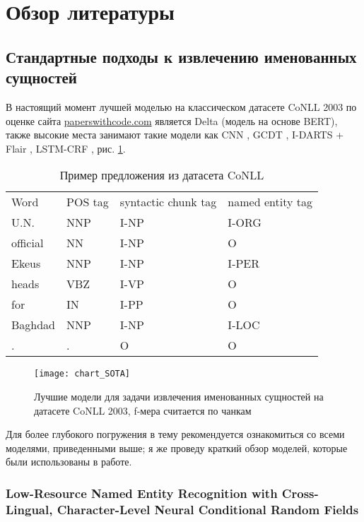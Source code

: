 \section{Обзор литературы}

\subsection{Стандартные подходы к извлечению именованных сущностей}

В настоящий момент лучшей моделью на классическом датасете CoNLL 2003 \cite{tjong-kim-sang-de-meulder-2003-introduction} по оценке сайта \href{https://paperswithcode.com/sota/named-entity-recognition-ner-on-conll-2003}{paperswithcode.com} является Delta \cite{delta} (модель на основе BERT), также высокие места занимают такие модели как CNN \cite{CNN_top_2_SOTA}, GCDT \cite{Liu:19}, I-DARTS + Flair \cite{jiang-etal-2019-improved}, LSTM-CRF \cite{strakova-etal-2019-neural}, рис. \ref{fig:chart_SOTA}.

\begin{table}[h]
\caption{Пример предложения из датасета CoNLL}
\begin{tabular}{llll}
Word & POS tag & syntactic chunk tag & named entity tag \\
U.N. & NNP & I-NP & I-ORG \\
official & NN & I-NP & O \\
Ekeus & NNP & I-NP& I-PER \\
heads & VBZ & I-VP & O\\
for & IN & I-PP & O \\
Baghdad & NNP & I-NP & I-LOC \\
. & . & O & O
\end{tabular}
\label{table:example_CoNLL}
\end{table}

\begin{figure}[h]
\texttt{[image: chart\_SOTA]}
\label{fig:chart_SOTA}
\caption{Лучшие модели для задачи извлечения именованных сущностей на датасете CoNLL 2003, f-мера считается по чанкам}
\end{figure}

Для более глубокого погружения в тему рекомендуется ознакомиться со всеми моделями, приведенными выше; я же проведу краткий обзор моделей, которые были использованы в работе.

\subsubsection{Low-Resource Named Entity Recognition with Cross-Lingual, Character-Level Neural Conditional Random Fields}

